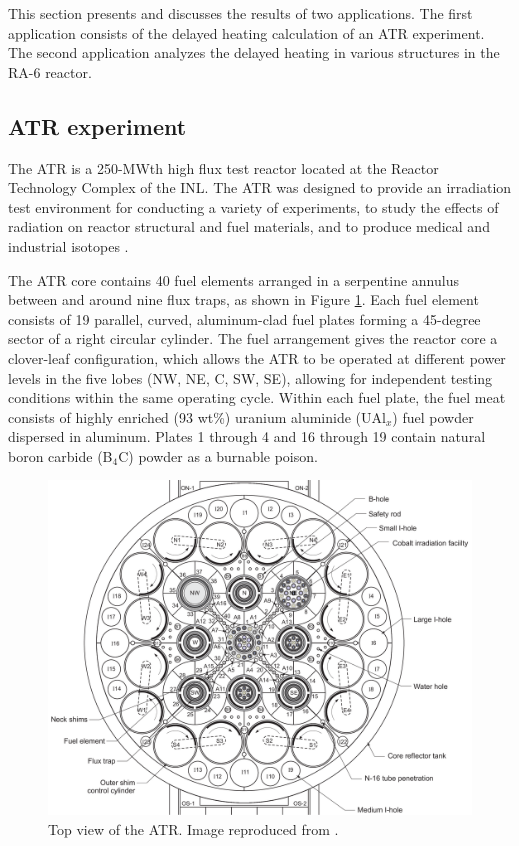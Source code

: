\documentclass{style/nseJournal}
\begin{document}
This section presents and discusses the results of two applications.
The first application consists of the delayed heating calculation of an ATR experiment.
The second application analyzes the delayed heating in various structures in the RA-6 reactor.


\subsection{ATR experiment}

The \gls*{ATR} is a 250-MWth high flux test reactor located at the Reactor Technology Complex of the \gls*{INL}.
The ATR was designed to provide an irradiation test environment for conducting a variety of experiments, to study the effects of radiation on reactor structural and fuel materials, and to produce medical and industrial isotopes \cite{ICSBEP, tomberlin_advanced_2002}.

The ATR core contains 40 fuel elements arranged in a serpentine annulus between and around nine flux traps, as shown in Figure \ref{fig:atr}.
Each fuel element consists of 19 parallel, curved, aluminum-clad fuel plates forming a 45-degree sector of a right circular cylinder.
The fuel arrangement gives the reactor core a clover-leaf configuration, which allows the \gls*{ATR} to be operated at different power levels in the five lobes (NW, NE, C, SW, SE), allowing for independent testing conditions within the same operating cycle.
Within each fuel plate, the fuel meat consists of highly enriched (93 wt\%) uranium aluminide (UAl$_x$) fuel powder dispersed in aluminum.
Plates 1 through 4 and 16 through 19 contain natural boron carbide (B$_4$C) powder as a burnable poison.

\begin{figure}[htbp!] %
    \centering
    \includegraphics[width=0.90\linewidth]{figures/atr2}
    \hfill
    \caption{Top view of the ATR. Image reproduced from \cite{ICSBEP}.}
    \label{fig:atr}
\end{figure}
\end{document}
